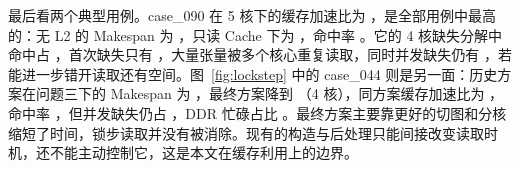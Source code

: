 最后看两个典型用例。case\_090 在 5 核下的缓存加速比为 ，是全部用例中最高的：无 L2 的 Makespan 为 ，只读 Cache 下为 ，命中率 。它的 4 核缺失分解中命中占 ，首次缺失只有 ，大量张量被多个核心重复读取，同时并发缺失仍有 ，若能进一步错开读取还有空间。图~\ref{fig:lockstep} 中的 case\_044 则是另一面：历史方案在问题三下的 Makespan 为 ，最终方案降到 （4 核），同方案缓存加速比为 ，命中率 ，但并发缺失仍占 ，DDR 忙碌占比 。最终方案主要靠更好的切图和分核缩短了时间，锁步读取并没有被消除。现有的构造与后处理只能间接改变读取时机，还不能主动控制它，这是本文在缓存利用上的边界。
